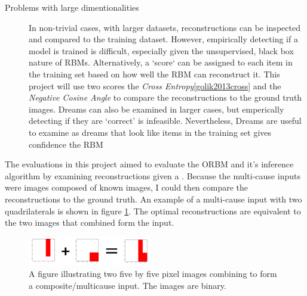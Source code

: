 \begin{description}
  \item[Problems  with large dimentionalities] In non-trivial cases, with larger datasets, reconstructions can be inspected and compared to the training dataset. However, empirically detecting if a model is trained is difficult, especially given the unsupervised, black box nature of RBMs.
  Alternatively, a `score` can be assigned to each item in the training set based on how well the RBM can reconstruct it.
  This project will use two scores the \emph{Cross Entropy}\ref{golik2013cross} and the \emph{Negative Cosine Angle} to compare the reconstructions to the ground truth images.
  Dreams can also be examined in larger cases, but emperically detecting if they are `correct' is infeasible. Nevertheless, Dreams are useful to examine as dreams that look like items in the training set gives confidence the RBM 

\end{description}



The evaluations in this project aimed to evaluate the ORBM and it's inference algorithm by examining reconstructions given a . Because the multi-cause inputs were images composed of known images, I could then compare the reconstructions to the ground truth. An example of a multi-cause input with two quadrilaterals is shown in figure \ref{F:Composite-Example}. The optimal reconstructions are equivalent to the two images that combined form the input.

\begin{figure}
  \begin{center}
    \includegraphics[width=0.48\textwidth]{Assets/Composite-Example.png}
  \end{center}
  \caption{A figure illustrating two five by five pixel images combining to form a composite/multicause input. The images are binary.}
  \label{F:Composite-Example}
\end{figure}

